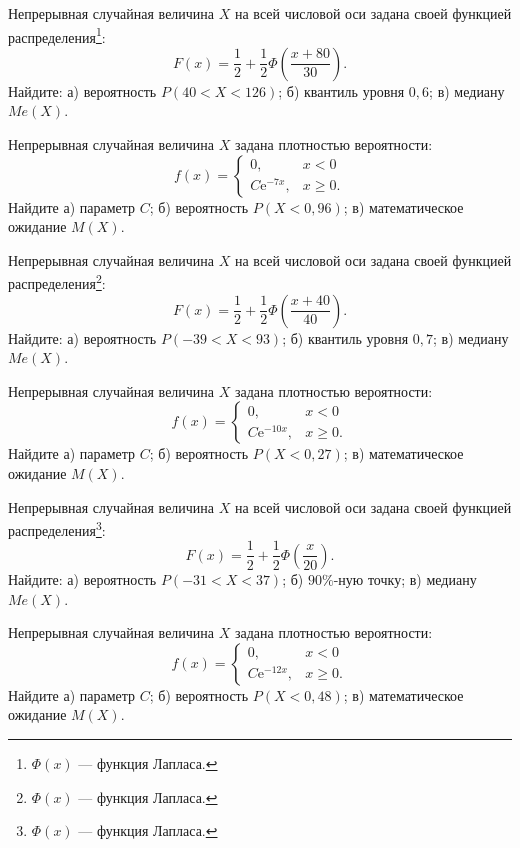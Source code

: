 \vfill

\newpage\setcounter{zad}{0}

\z Непрерывная случайная величина $X$ на всей числовой оси задана своей функцией распределения\footnote{$\Phi(x)$ --- функция Лапласа.}: $$ F(x) = \frac{1}{2} + \frac{1}{2}\Phi\left( \frac{x + 80}{30} \right). $$ Найдите: а) вероятность $P(40 < X < 126)$; б) квантиль уровня $0{,}6$; в) медиану $Me(X)$.


\vfill

\z Непрерывная случайная величина $X$ задана плотностью вероятности: $$ f(x) = \begin{cases}0, & x < 0 \\ C\mathrm{e}^{-7x}, & x \geqslant 0.\end{cases} $$ Найдите а) параметр $C$; б) вероятность $P(X < 0{,}96)$; в) математическое ожидание $M(X)$.
 

\vfill

\newpage\setcounter{zad}{0}

\z Непрерывная случайная величина $X$ на всей числовой оси задана своей функцией распределения\footnote{$\Phi(x)$ --- функция Лапласа.}: $$ F(x) = \frac{1}{2} + \frac{1}{2}\Phi\left( \frac{x + 40}{40} \right). $$ Найдите: а) вероятность $P(-39 < X < 93)$; б) квантиль уровня $0{,}7$; в) медиану $Me(X)$.


\vfill

\z Непрерывная случайная величина $X$ задана плотностью вероятности: $$ f(x) = \begin{cases}0, & x < 0 \\ C\mathrm{e}^{-10x}, & x \geqslant 0.\end{cases} $$ Найдите а) параметр $C$; б) вероятность $P(X < 0{,}27)$; в) математическое ожидание $M(X)$.
 

\vfill

\newpage\setcounter{zad}{0}

\z Непрерывная случайная величина $X$ на всей числовой оси задана своей функцией распределения\footnote{$\Phi(x)$ --- функция Лапласа.}: $$ F(x) = \frac{1}{2} + \frac{1}{2}\Phi\left( \frac{x}{20} \right). $$ Найдите: а) вероятность $P(-31 < X < 37)$; б) $90\%$-ную точку; в) медиану $Me(X)$.


\vfill

\z Непрерывная случайная величина $X$ задана плотностью вероятности: $$ f(x) = \begin{cases}0, & x < 0 \\ C\mathrm{e}^{-12x}, & x \geqslant 0.\end{cases} $$ Найдите а) параметр $C$; б) вероятность $P(X < 0{,}48)$; в) математическое ожидание $M(X)$.
 

